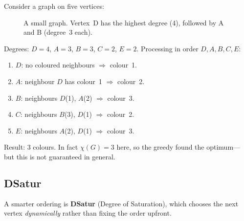 \begin{example}
\label{ex:greedy-colour-maxdeg}
Consider a graph on five vertices:

\begin{figure}[H]
\centering
{}
\caption{A small graph.  Vertex~D has the highest degree (4),
         followed by A and B (degree~3 each).}
\label{fig:greedy-colour-graph}
\end{figure}

\noindent
Degrees: $D = 4$, $A = 3$, $B = 3$, $C = 2$, $E = 2$.
Processing in order $D, A, B, C, E$:
\begin{enumerate}[nosep]
  \item $D$: no coloured neighbours $\Rightarrow$ colour~1.
  \item $A$: neighbour $D$ has colour~1 $\Rightarrow$ colour~2.
  \item $B$: neighbours $D$(1), $A$(2) $\Rightarrow$ colour~3.
  \item $C$: neighbours $B$(3), $D$(1) $\Rightarrow$ colour~2.
  \item $E$: neighbours $A$(2), $D$(1) $\Rightarrow$ colour~3.
\end{enumerate}
Result: 3 colours.  In fact $\chi(G) = 3$ here, so the greedy
found the optimum---but this is not guaranteed in general.
\end{example}

\subsection{DSatur}
\label{ssec:dsatur}

A smarter ordering is \textbf{DSatur}
(Degree of Saturation),%
which chooses the next vertex \emph{dynamically} rather than
fixing the order upfront.

